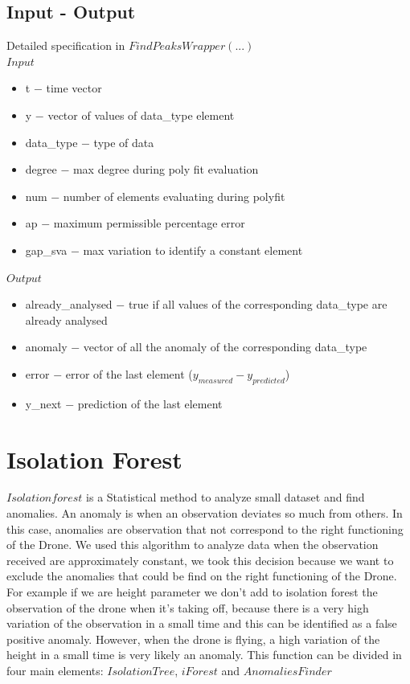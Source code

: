\documentclass[journal]{IEEEtran}
\begin{document}
\subsection{Input - Output}
Detailed specification in $FindPeaksWrapper(...)$
\\
$Input$
\begin{itemize}
\item t $-$ time vector 
\item y $-$ vector of values of data\_type element
\item data\_type $-$ type of data
\item degree $-$ max degree during poly fit evaluation
\item num $-$ number of elements evaluating during polyfit
\item ap $-$ maximum permissible percentage error
\item gap\_sva $-$ max variation to identify a constant element
\end{itemize}

$Output$
\begin{itemize}
\item already\_analysed $-$ true if all values of the corresponding data\_type are already analysed
\item anomaly $-$ vector of all the anomaly of the corresponding data\_type
\item error $-$ error of the last element ($y_{measured}-y_{predicted}$)
\item y\_next $-$ prediction of the last element
\end{itemize}


\section{Isolation Forest}
$Isolation forest$ is a Statistical method to analyze small dataset and find anomalies. An anomaly is when an observation deviates so much from others.  In this case, anomalies are observation that not correspond to the right functioning of the Drone. We used this algorithm to analyze data when the observation received are approximately constant, we took this decision because we want to exclude the anomalies that could be find on the right functioning of the Drone. For example if we are height parameter we don’t add to isolation forest the observation of the drone when it’s  taking off, because there is a very high variation of the observation in a small time and this can be identified as a false positive anomaly. However, when the drone is flying, a high variation of the height in a small time is very likely an anomaly. 
This function can be divided in four main elements: $Isolation Tree$, $iForest$ and $Anomalies Finder$
\end{document}
